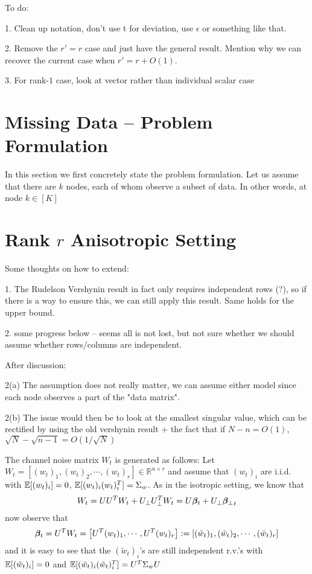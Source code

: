 \documentclass[10pt]{article}
\newcommand{\R}{\mathbb{R}}
\begin{document}
{\color{red} 
To do:

1. Clean up notation, don't use t for deviation, use $\epsilon$ or something like that. 

2. Remove the $r'=r$ case and just have the general result. Mention why we can recover the current case when $r' = r + O(1)$. 

3. For rank-$1$ case, look at vector rather than individual scalar case


}


\section{Missing Data -- Problem Formulation}
In this section we first concretely state the problem formulation. Let us assume that there are $k$ nodes, each of whom observe a subset of data. In other words, at node $k \in [K]$

\section{Rank $r$ Anisotropic Setting}

{\color{blue}
Some thoughts on how to extend:

1. The Rudelson Vershynin result in fact only requires independent rows (?), so if there is a way to ensure this, we can still apply this result. Same holds for the upper bound. 

2. some progress below -- seems all is not lost, but not sure whether we should assume whether rows/columns are independent. 

After discussion:

2(a) The assumption does not really matter, we can assume either model since each node observes a part of the "data matrix". 

2(b) The issue would then be to look at the smallest singular value, which can be rectified by using the old vershynin result + the fact that if $N - n = O(1)$, $\sqrt{N} - \sqrt{n-1} = O(1/\sqrt{N})$

}

The channel noise matrix $W_t$ is generated as follows: Let $W_t = [(w_t)_1, (w_t)_2, \cdots, (w_t)_r] \in \R^{n \times r}$ and assume that $(w_t)_i$ are i.i.d. with $\mathbb{E}[(w_t)_i] = 0$, $\mathbb{E}[(w_t)_i (w_t)_i^T] = \Sigma_w$. As in the isotropic setting, we know that
\begin{align*}
W_t = U U^T W_t + U_\perp U_\perp^T W_t = U \bm{\beta}_t + U_\perp {\bm{\beta}_{\perp}}_t
\end{align*}
now observe that 
\begin{align*}
\bm{\beta}_t = U^T W_t = \left[U^T (w_t)_1, \cdots, U^T (w_t)_r \right] := [(\tilde w_t)_1, (\tilde w_t)_2, \cdots, (\tilde w_t)_r]
\end{align*}
and it is easy to see that the $(\tilde w_t)_i$'s are still independent r.v.'s with $\mathbb{E}[(\tilde w_t)_i] = 0$ and $\mathbb{E}[(\tilde w_t)_i (\tilde w_t)_i^T] = U^T\Sigma_w U$
\end{document}
